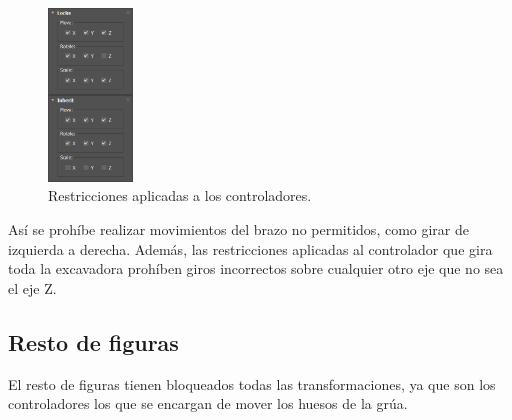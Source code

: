 \begin{figure}[H]
    \centering
    \includegraphics[width=0.2\textwidth]{imagenes/controladorverticallock.png}
    \caption{Restricciones aplicadas a los controladores.}
 \end{figure}

Así se prohíbe realizar movimientos del brazo no permitidos, como girar de izquierda a derecha. Además, las restricciones aplicadas al controlador que gira toda la excavadora prohíben giros incorrectos sobre cualquier otro eje que no sea el eje Z.

\subsection{Resto de figuras}

El resto de figuras tienen bloqueados todas las transformaciones, ya que son los controladores los que se encargan de mover los huesos de la grúa.